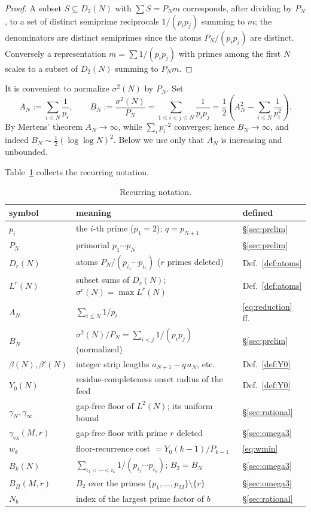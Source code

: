 \documentclass[11pt]{amsart}
\theoremstyle{plain}
\theoremstyle{definition}
\begin{document}
\begin{proof}
A subset $S\subseteq D_2(N)$ with $\sum S=P_N m$ corresponds, after dividing by
$P_N$, to a set of distinct semiprime reciprocals $1/(p_ip_j)$ summing to $m$;
the denominators are distinct semiprimes since the atoms $P_N/(p_ip_j)$ are
distinct.  Conversely a representation $m=\sum 1/(p_ip_j)$ with primes among the
first $N$ scales to a subset of $D_2(N)$ summing to $P_N m$.
\end{proof}

It is convenient to normalize $\sigma^2(N)$ by $P_N$.  Set
\[
A_N:=\sum_{i\le N}\frac{1}{p_i},\qquad
B_N:=\frac{\sigma^2(N)}{P_N}=\sum_{1\le i<j\le N}\frac{1}{p_ip_j}
=\frac12\!\left(A_N^2-\sum_{i\le N}\frac{1}{p_i^2}\right).
\]
By Mertens' theorem $A_N\to\infty$, while $\sum_i p_i^{-2}$ converges; hence
$B_N\to\infty$, and indeed $B_N\sim\frac12(\log\log N)^2$.  Below we use only that
$A_N$ is increasing and unbounded.

Table~\ref{tab:notation} collects the recurring notation.

\begin{table}[h]
\centering
\small
\begin{tabular}{@{}lll@{}}
\toprule
symbol & meaning & defined \\
\midrule
$p_i$ & the $i$-th prime ($p_1=2$); $q=p_{N+1}$ & \S\ref{sec:prelim}\\
$P_N$ & primorial $p_1\cdots p_N$ & \S\ref{sec:prelim}\\
$D_r(N)$ & atoms $P_N/(p_{i_1}\cdots p_{i_r})$ ($r$ primes deleted) & Def.~\ref{def:atoms}\\
$L^r(N)$ & subset sums of $D_r(N)$; $\sigma^r(N)=\max L^r(N)$ & Def.~\ref{def:atoms}\\
$A_N$ & $\sum_{i\le N}1/p_i$ & \eqref{eq:reduction} ff.\\
$B_N$ & $\sigma^2(N)/P_N=\sum_{i<j}1/(p_ip_j)$ (normalized) & \S\ref{sec:prelim}\\
$\beta(N),\beta'(N)$ & integer strip lengths $a_{N+1}-q\,a_N$, etc. & Def.~\ref{def:Y0}\\
$Y_0(N)$ & residue-completeness onset radius of the feed & Def.~\ref{def:Y0}\\
$\gamma_N,\gamma_\infty$ & gap-free floor of $L^2(N)$; its uniform bound & \S\ref{sec:rational}\\
$\gamma_{\mathrm{ex}}(M,r)$ & gap-free floor with prime $r$ deleted & \S\ref{sec:omega3}\\
$w_k$ & floor-recurrence cost $=Y_0(k-1)/P_{k-1}$ & \eqref{eq:wmin}\\
$B_k(N)$ & $\sum_{i_1<\cdots<i_k}1/(p_{i_1}\cdots p_{i_k})$; $B_2=B_N$ & \S\ref{sec:omega3}\\
$B_\Pi(M,r)$ & $B_2$ over the primes $\{p_1,\dots,p_M\}\setminus\{r\}$ & \S\ref{sec:omega3}\\
$N_b$ & index of the largest prime factor of $b$ & \S\ref{sec:rational}\\
\bottomrule
\end{tabular}
\caption{Recurring notation.}
\label{tab:notation}
\end{table}
\end{document}
